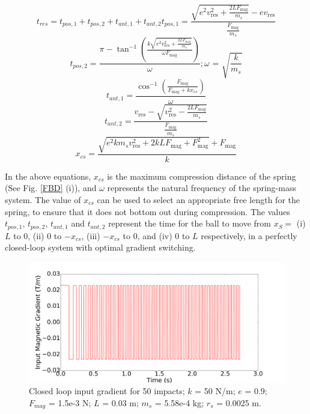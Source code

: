 \documentclass[letterpaper, 10 pt, conference]{ieeeconf}  %
\begin{document}
\begin{equation}
t_{res}=t_{pos,1}+t_{pos,2}+t_{ant,1}+t_{ant,2}
t_{pos,1}=\frac{\sqrt{e^2 v_{\text{res}}^2+\frac{2 L F_{\text{mag}}}{m_s}}-e v_{\text{res}}}{\frac{F_{\text{mag}}}{m_s}}
\label{tres1}
\end{equation}
\begin{equation}
t_{pos,2}=\frac{\pi -\tan ^{-1}\left(\frac{k \sqrt{e^2 v_{\text{res}}^2+\frac{2 L F_{\text{mag}}}{m_s}}}{\omega  F_{\text{mag}}}\right)}{\omega } ; \text{$\omega $ = }
\sqrt{\frac{k}{m_s}}
\label{tres2}
\end{equation}
\begin{equation}
t_{ant,1}=\frac{\cos ^{-1}\left(\frac{F_{\text{mag}}}{F_{\text{mag}}+k x_{cs}}\right)}{\omega }
\label{tres3}
\end{equation}
\begin{equation}
t_{ant,2}=\frac{v_{\text{res}}-\sqrt{v_{\text{res}}^2-\frac{2 L F_{\text{mag}}}{m_s}}}{\frac{F_{\text{mag}}}{m_s}}
\label{tres4}
\end{equation}
\begin{equation}
x_{cs}=\frac{\sqrt{e^2 k m_s v_{\text{res}}^2+2 k L F_{\text{mag}}+F_{\text{mag}}^2}+F_{\text{mag}}}{k}
\label{tres5}
\end{equation}


In the above equations, $x_{cs}$ is the maximum compression distance of the spring (See Fig. \ref{FBD} (i)), and $\omega$ represents the natural frequency of the spring-mass system. The value of $x_{cs}$ can be used to select an appropriate free length for the spring, to ensure that it does not bottom out during compression. The values $t_{pos,1}$, $t_{pos,2}$, $t_{ant,1}$ and $t_{ant,2}$ represent the time for the ball to move from $x_S =$ (i) $L$ to 0, (ii) 0 to $-x_{cs}$, (iii) $-x_{cs}$ to 0, and (iv) 0 to $L$ respectively, in a perfectly closed-loop system with optimal gradient switching.



\begin{figure}
	\includegraphics[width=\linewidth]{CLinput.pdf}
	\caption{Closed loop input gradient for 50 impacts; $k$ = 50 N/m; $e$ = 0.9; $F_{mag}$ = 1.5e-3 N; $L$ = 0.03 m; $m_s$ = 5.58e-4 kg; $r_s$ = 0.0025 m.}
	\label{CLinput}
	
\end{figure}
\end{document}
